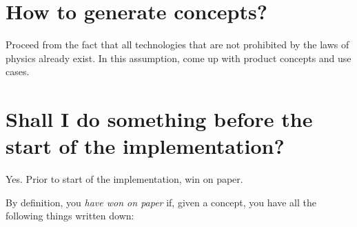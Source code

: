 \documentclass[11pt]{article}
\theoremstyle{remark}
\theoremstyle{definition}
\begin{document}
\section{How to generate concepts?}

Proceed from the fact that all technologies that are not prohibited by the laws of physics already exist. In this assumption, come up with product concepts and use cases.





\section{Shall I do something before the start of the implementation?}

Yes. Prior to start of the implementation, win on paper.


By definition, you \textit{have won on paper} if, given a concept, you have all the following things written down: 
\end{document}
